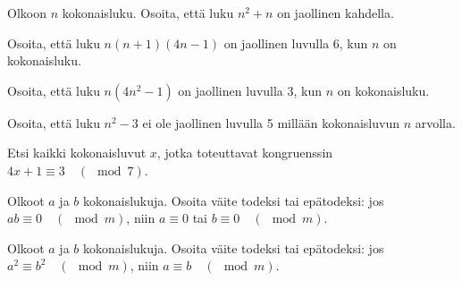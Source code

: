 \begin{kotitehtavasivu}
\begin{tehtava}
	Olkoon $n$ kokonaisluku. Osoita, että luku $n^2 + n$ on jaollinen kahdella.
\end{tehtava}

\begin{tehtava}
	Osoita, että luku $n(n + 1)(4n - 1)$ on jaollinen luvulla 6, kun $n$ on kokonaisluku.
\end{tehtava}

\begin{tehtava}
	Osoita, että luku $n(4n^2 - 1)$ on jaollinen luvulla 3, kun $n$ on kokonaisluku.
\end{tehtava}

\begin{tehtava}
	Osoita, että luku $n^2 - 3$ ei ole jaollinen luvulla 5 millään kokonaisluvun $n$ arvolla.
\end{tehtava}

\begin{tehtava}
	Etsi kaikki kokonaisluvut $x$, jotka toteuttavat kongruenssin $4x+1\equiv 3\quad (\mod 7)$.
\end{tehtava}

\begin{tehtava}
	Olkoot $a$ ja $b$ kokonaislukuja. Osoita väite todeksi tai epätodeksi: jos $ab \equiv 0 \quad (\mod m)$, niin $a \equiv 0$ tai $b\equiv 0 \quad (\mod m)$.
\end{tehtava}

\begin{tehtava}
	Olkoot $a$ ja $b$ kokonaislukuja. Osoita väite todeksi tai epätodeksi: jos $a^2 \equiv b^2 \quad (\mod m)$, niin $a \equiv b \quad (\mod m)$.
\end{tehtava}


\end{kotitehtavasivu}

